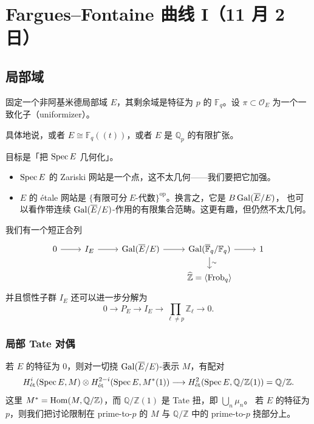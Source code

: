 \section[Fargues--Fontaine 曲线 I]{Fargues--Fontaine 曲线 I（11 月 2 日）}

\subsection{局部域}

固定一个非阿基米德局部域 $E$，其剩余域是特征为 $p$ 的 $\mathbb{F}_q$。设 $\pi\subset\mathcal{O}_E$ 为一个一致化子（uniformizer）。

\begin{example}
具体地说，或者 $E\cong\mathbb{F}_q((t))$，或者 $E$ 是 $\mathbb{Q}_p$ 的有限扩张。
\end{example}

目标是「把 $\Spec E$ 几何化」。

\begin{itemize}
  \item $\Spec E$ 的 Zariski 网站是一个点，这不太几何——我们要把它加强。
  \item $E$ 的 étale 网站是 $\{\text{有限可分}\ E\text{-代数}\}^{\mathrm{op}}$。换言之，它是 $B\Gal(\overline{E}/E)$，
        也可以看作带连续 $\Gal(\overline{E}/E)$-作用的有限集合范畴。这更有趣，但仍然不太几何。
\end{itemize}

我们有一个短正合列
\[
\begin{tikzcd}[column sep=2.4em, row sep=1.4em]
0 \arrow[r] & I_E \arrow[r] & \Gal(\overline{E}/E) \arrow[r]
  & \Gal(\overline{\mathbb{F}}_q/\mathbb{F}_q) \arrow[r] \arrow[d, "\sim"] & 1 \\
  & & & \widehat{\mathbb{Z}}=\langle\Frob_q\rangle &
\end{tikzcd}
\]
并且惯性子群 $I_E$ 还可以进一步分解为
\[
0\to P_E\to I_E\to\prod_{\ell\ne p}\mathbb{Z}_\ell\to0 .
\]

\subsubsection{局部 Tate 对偶}

若 $E$ 的特征为 $0$，则对一切挠 $\Gal(\overline{E}/E)$-表示 $M$，有配对
\[
H^i_{\et}(\Spec E,M)\otimes H^{2-i}_{\et}(\Spec E,M^*(1))
\longrightarrow H^2_{\et}(\Spec E,\mathbb{Q}/\mathbb{Z}(1))=\mathbb{Q}/\mathbb{Z}.
\]
这里 $M^*=\Hom(M,\mathbb{Q}/\mathbb{Z})$，而 $\mathbb{Q}/\mathbb{Z}(1)$ 是 Tate 扭，即 $\bigcup_n\mu_n$。
若 $E$ 的特征为 $p$，则我们把讨论限制在 prime-to-$p$ 的 $M$ 与 $\mathbb{Q}/\mathbb{Z}$ 中的 prime-to-$p$ 挠部分上。

